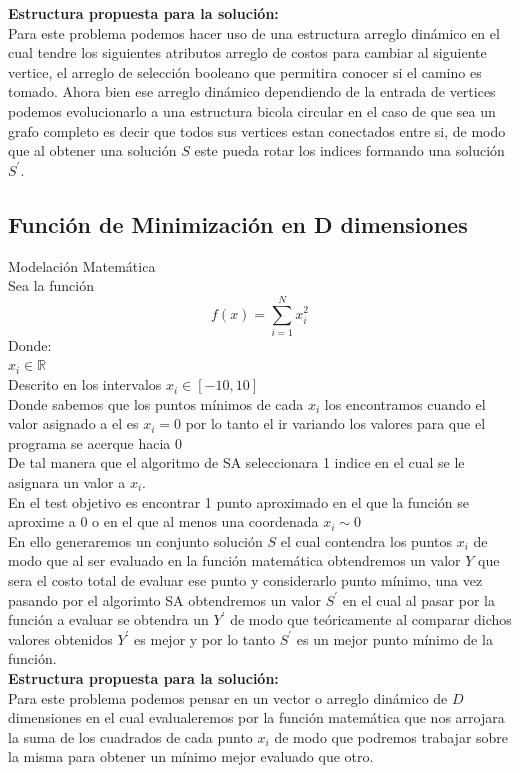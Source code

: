 \documentclass[10pt]{article}
\begin{document}
\textbf{Estructura propuesta para la solución:}\\
Para este problema podemos hacer uso de una estructura arreglo dinámico en el cual tendre los siguientes atributos arreglo de costos para cambiar al siguiente vertice, el arreglo de selección booleano que permitira conocer si el camino es tomado. Ahora bien ese arreglo dinámico dependiendo de la entrada de vertices podemos evolucionarlo a una estructura bicola circular en el caso de que sea un grafo completo es decir que todos sus vertices estan conectados entre si, de modo que al obtener una solución $S$ este pueda rotar los indices formando una solución $S^{'}$.



\subsection{Función de Minimización en D dimensiones}
Modelación Matemática\\
Sea la función
\[f(x)=\sum_{i=1}^{N}x_{i}^{2}\]
Donde:\\
\(\displaystyle x_{i}\in\mathbb{R}\)\\\vspace{0.25cm}Descrito en los intervalos \(\displaystyle x_{i}\in[-10,10]\)\\\vspace{0.25cm}
Donde sabemos que los puntos mínimos de cada $x_{i}$ los encontramos cuando el valor asignado a el es $x_{i}=0$ por lo tanto el ir variando los valores para que el programa se acerque hacia $0$\\
De tal manera que el algoritmo de SA seleccionara 1 indice en el cual se le asignara un valor a $x_{i}$.\\
En el test objetivo es encontrar 1 punto aproximado en el que la función se aproxime a $0$ o en el que al menos una coordenada $x_{i}\sim 0$
\\
En ello generaremos un conjunto solución $S$ el cual contendra los puntos $x_{i}$ de modo que al ser evaluado en la función matemática obtendremos un valor $Y$ que sera el costo total de evaluar ese punto y considerarlo punto mínimo, una vez pasando por el algorimto SA obtendremos un valor $S^{'}$ en el cual al pasar por la función a evaluar se obtendra un $Y^{'}$ de modo que teóricamente al comparar dichos valores obtenidos $Y^{'}$ es mejor y por lo tanto $S^{'}$ es un mejor punto mínimo de la función.\vspace{0.5cm}
\\\textbf{Estructura propuesta para la solución:}\\
Para este problema podemos pensar en un vector o arreglo dinámico de $D$ dimensiones en el cual evalualeremos por la función matemática que nos arrojara la suma de los cuadrados de cada punto $x_i$ de modo que podremos trabajar sobre la misma para obtener un mínimo mejor evaluado que otro.
\clearpage
\end{document}
